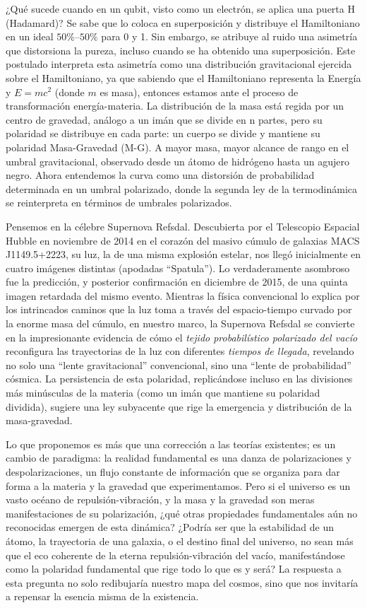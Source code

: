 \documentclass{book}
\begin{document}
¿Qué sucede cuando en un qubit, visto como un electrón, se aplica una puerta H (Hadamard)? Se sabe que lo coloca en superposición y distribuye el Hamiltoniano en un ideal $50\%$--$50\%$ para 0 y 1. Sin embargo, se atribuye al ruido una asimetría que distorsiona la pureza, incluso cuando se ha obtenido una superposición. Este postulado interpreta esta asimetría como una distribución gravitacional ejercida sobre el Hamiltoniano, ya que sabiendo que el Hamiltoniano representa la Energía y $E=mc^2$ (donde $m$ es masa), entonces estamos ante el proceso de transformación energía-materia. La distribución de la masa está regida por un centro de gravedad, análogo a un imán que se divide en n partes, pero su polaridad se distribuye en cada parte: un cuerpo se divide y mantiene su polaridad Masa-Gravedad (M-G). A mayor masa, mayor alcance de rango en el umbral gravitacional, observado desde un átomo de hidrógeno hasta un agujero negro. Ahora entendemos la curva como una distorsión de probabilidad determinada en un umbral polarizado, donde la segunda ley de la termodinámica se reinterpreta en términos de umbrales polarizados.

Pensemos en la célebre Supernova Refsdal. Descubierta por el Telescopio Espacial Hubble en noviembre de 2014 en el corazón del masivo cúmulo de galaxias MACS J1149.5+2223, su luz, la de una misma explosión estelar, nos llegó inicialmente en cuatro imágenes distintas (apodadas ``Spatula''). Lo verdaderamente asombroso fue la predicción, y posterior confirmación en diciembre de 2015, de una quinta imagen retardada del mismo evento. Mientras la física convencional lo explica por los intrincados caminos que la luz toma a través del espacio-tiempo curvado por la enorme masa del cúmulo, en nuestro marco, la Supernova Refsdal se convierte en la impresionante evidencia de cómo el \textit{tejido probabilístico polarizado del vacío} reconfigura las trayectorias de la luz con diferentes \textit{tiempos de llegada}, revelando no solo una ``lente gravitacional'' convencional, sino una ``lente de probabilidad'' cósmica. La persistencia de esta polaridad, replicándose incluso en las divisiones más minúsculas de la materia (como un imán que mantiene su polaridad dividida), sugiere una ley subyacente que rige la emergencia y distribución de la masa-gravedad.

Lo que proponemos es más que una corrección a las teorías existentes; es un cambio de paradigma: la realidad fundamental es una danza de polarizaciones y despolarizaciones, un flujo constante de información que se organiza para dar forma a la materia y la gravedad que experimentamos. Pero si el universo es un vasto océano de repulsión-vibración, y la masa y la gravedad son meras manifestaciones de su polarización, ¿qué otras propiedades fundamentales aún no reconocidas emergen de esta dinámica? ¿Podría ser que la estabilidad de un átomo, la trayectoria de una galaxia, o el destino final del universo, no sean más que el eco coherente de la eterna repulsión-vibración del vacío, manifestándose como la polaridad fundamental que rige todo lo que es y será? La respuesta a esta pregunta no solo redibujaría nuestro mapa del cosmos, sino que nos invitaría a repensar la esencia misma de la existencia.
\end{document}
